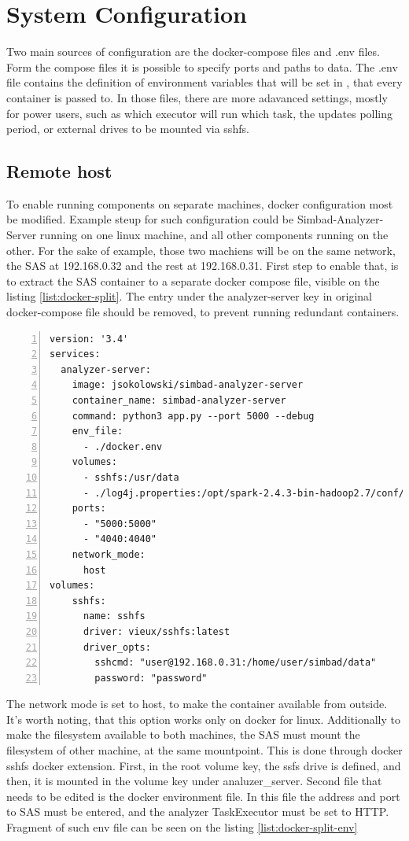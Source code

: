 \section{System Configuration}
Two main sources of configuration are the docker-compose files and .env files. Form the compose files it is possible to specify ports and paths to data. The .env file contains the definition of environment variables that will be set in , that every container is passed to. In those files, there are more adavanced settings, mostly for power users, such as which executor will run which task, the updates polling period, or external drives to be mounted via sshfs.
\subsection{Remote host}
To enable running components on separate machines, docker configuration most be modified. Example steup for such configuration could be Simbad-Analyzer-Server running on one linux machine, and all other components running on the other.
For the sake of example, those two machiens will be on the same network, the SAS at 192.168.0.32 and the rest at 192.168.0.31. First step to enable that, is to extract the SAS container to a separate docker compose file, visible on the listing \ref{list:docker-split}. The entry under the analyzer-server key in original docker-compose file should be removed, to prevent running redundant containers.
\begin{lstlisting}[label=list:docker-split,caption=prod-docker-compose.yaml file, basicstyle=\footnotesize\ttfamily, numbers=left, escapechar=|]
version: '3.4'
services:
  analyzer-server:
    image: jsokolowski/simbad-analyzer-server
    container_name: simbad-analyzer-server
    command: python3 app.py --port 5000 --debug
    env_file:
      - ./docker.env
    volumes:
      - sshfs:/usr/data
      - ./log4j.properties:/opt/spark-2.4.3-bin-hadoop2.7/conf/log4j.properties
    ports:
      - "5000:5000"
      - "4040:4040"
    network_mode:
      host
volumes:
    sshfs:
      name: sshfs
      driver: vieux/sshfs:latest
      driver_opts:
        sshcmd: "user@192.168.0.31:/home/user/simbad/data"
        password: "password"
\end{lstlisting}
The network mode is set to host, to make the container available from outside. It's worth noting, that this option works only on docker for linux. Additionally to make the filesystem available to both machines, the SAS must mount the filesystem of other machine, at the same mountpoint. This is done through docker sshfs docker extension. First, in the root volume key, the ssfs drive is defined, and then, it is mounted in the volume key under analuzer\_server. Second file that needs to be edited is the docker environment file. In this file the address and port to SAS must be entered, and the analyzer TaskExecutor must be set to HTTP. Fragment of such env file can be seen on the listing \ref{list:docker-split-env}
